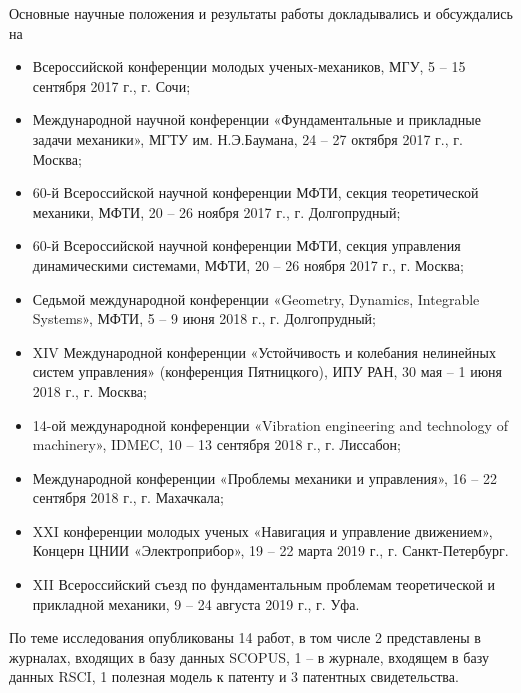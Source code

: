 Основные научные положения и результаты работы докладывались и обсуждались на 
\begin{itemize}
\item Всероссийской конференции молодых ученых-механиков, МГУ, 5 -- 15 сентября 2017 г., г. Сочи;
\item Международной научной конференции «Фундаментальные и прикладные задачи механики», МГТУ им. Н.Э.Баумана, 24 -- 27 октября 2017 г., г. Москва;
\item 60-й Всероссийской научной конференции МФТИ, секция теоретической механики, МФТИ, 20 -- 26 ноября 2017 г., г. Долгопрудный;
\item 60-й Всероссийской научной конференции МФТИ, секция управления динамическими системами, МФТИ, 20 -- 26 ноября 2017 г., г. Москва;
\item Седьмой международной конференции «Geometry, Dynamics, Integrable Systems», МФТИ, 5 -- 9 июня 2018 г., г. Долгопрудный;
\item XIV Международной конференции «Устойчивость и колебания нелинейных систем управления» (конференция Пятницкого), ИПУ РАН, 30 мая -- 1 июня 2018 г., г. Москва;
\item 14-ой международной конференции «Vibration engineering and technology of machinery», IDMEC,  10 -- 13 сентября 2018 г., г. Лиссабон;
\item Международной конференции «Проблемы механики и управления», 16 -- 22 сентября 2018 г., г. Махачкала;
\item XXI конференции молодых ученых «Навигация и управление движением», Концерн ЦНИИ «Электроприбор», 19 -- 22 марта 2019 г., г. Санкт-Петербург.
\item XII Всероссийский съезд по фундаментальным проблемам теоретической и прикладной механики, 9 -- 24 августа 2019 г., г. Уфа.
\end{itemize}
По теме исследования опубликованы 14 работ, в том числе 2 представлены в журналах, входящих в базу данных SCOPUS, 1 -- в журнале, входящем в базу данных RSCI, 1 полезная модель к патенту и 3 патентных свидетельства.

